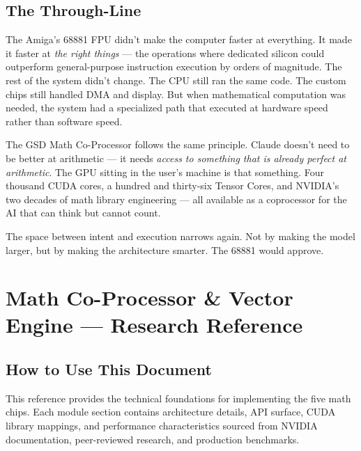 \documentclass[11pt,letterpaper]{article}
\newcommand{\stageheader}[2]{%
  \noindent\colorbox{#2}{\makebox[\textwidth][l]{%
    \textcolor{white}{\bfseries\sffamily\hspace{6pt}#1\hspace{6pt}}}}%
  \vspace{0.5em}\par%
}
\begin{document}
\subsection{The Through-Line}

\begin{quotebox}
The Amiga's 68881 FPU didn't make the computer faster at everything. It made it faster at \textit{the right things} --- the operations where dedicated silicon could outperform general-purpose instruction execution by orders of magnitude. The rest of the system didn't change. The CPU still ran the same code. The custom chips still handled DMA and display. But when mathematical computation was needed, the system had a specialized path that executed at hardware speed rather than software speed.

The GSD Math Co-Processor follows the same principle. Claude doesn't need to be better at arithmetic --- it needs \textit{access to something that is already perfect at arithmetic}. The GPU sitting in the user's machine is that something. Four thousand CUDA cores, a hundred and thirty-six Tensor Cores, and NVIDIA's two decades of math library engineering --- all available as a coprocessor for the AI that can think but cannot count.

The space between intent and execution narrows again. Not by making the model larger, but by making the architecture smarter. The 68881 would approve.
\end{quotebox}

\newpage

\stageheader{STAGE 2 --- RESEARCH REFERENCE}{secondary}

\section{Math Co-Processor \& Vector Engine --- Research Reference}

\subsection{How to Use This Document}

This reference provides the technical foundations for implementing the five math chips. Each module section contains architecture details, API surface, CUDA library mappings, and performance characteristics sourced from NVIDIA documentation, peer-reviewed research, and production benchmarks.
\end{document}
